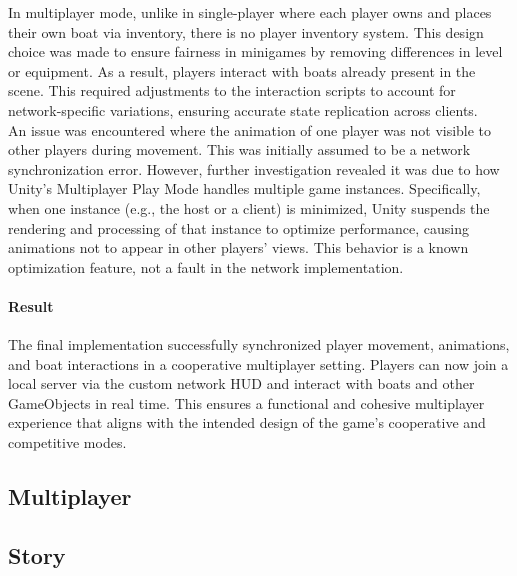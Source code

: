 \documentclass{article}
\begin{document}
In multiplayer mode, unlike in single-player where each player owns and places their own boat via inventory, there is no player inventory system. This design choice was made to ensure fairness in minigames by removing differences in level or equipment. As a result, players interact with boats already present in the scene. This required adjustments to the interaction scripts to account for network-specific variations, ensuring accurate state replication across clients.\\

An issue was encountered where the animation of one player was not visible to other players during movement. This was initially assumed to be a network synchronization error. However, further investigation revealed it was due to how Unity's Multiplayer Play Mode handles multiple game instances. Specifically, when one instance (e.g., the host or a client) is minimized, Unity suspends the rendering and processing of that instance to optimize performance, causing animations not to appear in other players' views. This behavior is a known optimization feature, not a fault in the network implementation.

\paragraph{Result}\hfill

The final implementation successfully synchronized player movement, animations, and boat interactions in a cooperative multiplayer setting. Players can now join a local server via the custom network HUD and interact with boats and other GameObjects in real time. This ensures a functional and cohesive multiplayer experience that aligns with the intended design of the game's cooperative and competitive modes.











\newpage
\subsection{Multiplayer}









\newpage
\subsection{Story}
\end{document}
